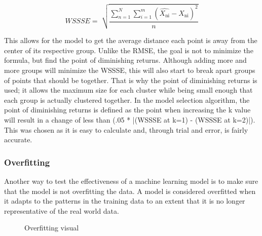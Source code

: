 \documentclass[9pt,twocolumn,twoside]{idsi}
\begin{document}
\begin{equation}
WSSSE =\sqrt[]{\frac{\sum_{n=1}^{N}\sum_{i=1}^{m} (\hat{X_{\text{ni}}} - X_{\text{ni}})^2}{n}}
\label{eq:wssse}
\end{equation}

This allows for the model to get the average distance each point is away from the center of its respective group. Unlike the RMSE, the goal is not to minimize the formula, but find the point of diminishing returns. Although adding more and more groups will minimize the WSSSE, this will also start to break apart groups of points that should be together. That is why the point of diminishing returns is used; it allows the maximum size for each cluster while being small enough that each group is actually clustered together. In the model selection algorithm, the point of diminishing returns is defined as the point when increasing the k value will result in a change of less than (.05 * |(WSSSE at k=1) - (WSSSE at k=2)|). This was chosen as it is easy to calculate and, through trial and error, is fairly accurate.

\subsubsection{Overfitting} \label{overfitting}

Another way to test the effectiveness of a machine learning model is to make sure that the model is not overfitting the data. A model is considered overfitted when it adapts to the patterns in the training data to an extent that it is no longer representative of the real world data.

\begin{figure}[htbp]
\centering
{}
\caption{Overfitting visual \cite{overfitting_image_bib}}
\label{fig:overfittingImage}
\end{figure}
\end{document}
